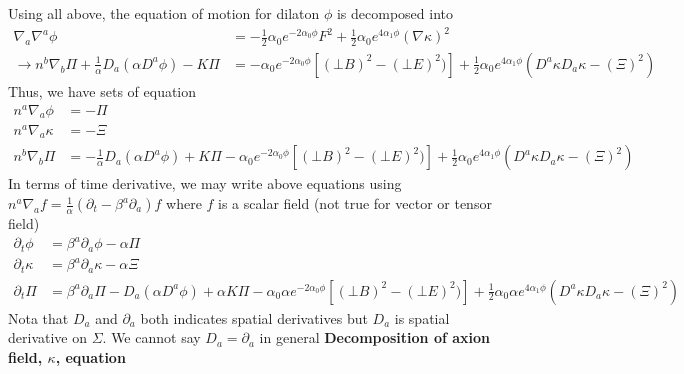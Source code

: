 \documentclass[prd]{revtex4}
\begin{document}
Using all above, the equation of motion for dilaton $\phi$ is decomposed into
\begin{align}
\nabla_a \nabla^a \phi &= -\frac{1}{2} \alpha_0 e^{-2 \alpha_0 \phi} F^2 + \frac{1}{2} \alpha_0 e^{4 \alpha_1 \phi} (\nabla \kappa)^2 \nonumber \\
\rightarrow n^b \nabla_b \Pi + \frac{1}{\alpha} D_a (\alpha D^a \phi) - K \Pi &= -\alpha_0 e^{-2 \alpha_0 \phi}  [ (\bot B)^2 - (\bot E)^2)]  + \frac{1}{2} \alpha_0 e^{4 \alpha_1 \phi} (D^a \kappa D_a \kappa - (\Xi)^2)
\end{align}
Thus, we have sets of equation 
\begin{align}
n^a \nabla_a \phi &= - \Pi \\
n^a \nabla_a \kappa &= -\Xi \\
n^b \nabla_b \Pi &= - \frac{1}{\alpha} D_a (\alpha D^a \phi) + K \Pi -\alpha_0 e^{-2 \alpha_0 \phi}  [ (\bot B)^2 - (\bot E)^2)]  + \frac{1}{2} \alpha_0 e^{4 \alpha_1 \phi} (D^a \kappa D_a \kappa - (\Xi)^2)
\end{align}
In terms of time derivative, we may write above equations using $n^a \nabla_a f = \frac{1}{\alpha}(\partial_t - \beta^a \partial_a) f $ where $f$ is a scalar field (not true for vector or tensor field)
\begin{align}
\partial_t \phi &= \beta^a \partial_a \phi - \alpha \Pi \\
\partial_t \kappa &= \beta^a \partial_a \kappa - \alpha \Xi  \\
\partial_t \Pi &= \beta^a \partial_a \Pi - D_a (\alpha D^a \phi) + \alpha K \Pi -\alpha_0 \alpha e^{-2 \alpha_0 \phi}  [ (\bot B)^2 - (\bot E)^2)]  + \frac{1}{2} \alpha_0 \alpha e^{4 \alpha_1 \phi} (D^a \kappa D_a \kappa - (\Xi)^2)
\end{align}
Nota that $D_a$ and $\partial_a$ both indicates spatial derivatives but $D_a$ is spatial derivative on $\Sigma$. We cannot say $D_a = \partial_a$ in general
\newline
\newline
\textbf{Decomposition of axion field, $\kappa$, equation}
\end{document}
